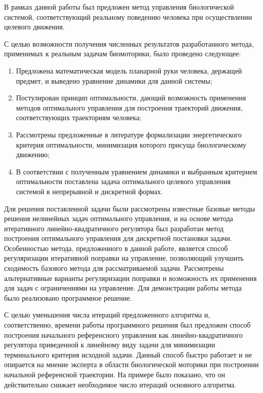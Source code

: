 \documentclass[../doc.tex]{subfiles}
\begin{document}
    В рамках данной работы был предложен метод управления биологической системой,
    соответствующий реальному поведению человека при осуществлении целевого движения.

    С целью возможности получения численных результатов разработанного метода,
        применимых к реальным задачам биомоторики, было проведено следующее:
    \begin{enumerate}\itemsep0em
        \item Предложена математическая модель планарной руки человека, держащей предмет,
            и выведено уравнение динамики для данной системы;
        \item Постулирован принцип оптимальности, дающий возможность применения методов
            оптимального управления для построения траекторий движения, соответствующих
            траекториям человека;
        \item Рассмотрены предложенные в литературе формализации энергетического критерия оптимальности, минимизация которого присуща биологическому движению;
        \item В соответствии с полученным уравнением динамики и выбранным критерием оптимальности поставлена задача оптимального целевого управления системой в непрерывной и дискретной формах.
    \end{enumerate}
    
    Для решения поставленной задачи были рассмотрены известные базовые методы решения нелинейных
        задач оптимального управления, и на основе метода итеративного линейно-квадратичного регулятора
        был разработан метод построения оптимального управления для дискретной постановки задачи.
    Особенностью метода, предложенного в данной работе, является способ регуляризации итеративной поправки на управление,
        позволяющий улучшить сходимость базового метода для рассматриваемой задачи.
    Рассмотрены альтернативные варианты регуляризации поправки и возможность их применения для задач
        с ограничениями на управление.
    Для демонстрации работы метода было реализовано программное решение.

    С целью уменьшения числа итераций предложенного алгоритма и, соответственно, времени работы
        программного решения был предложен способ построения начального референсного управления как
        линейно-квадратичного регулятора приведенной к линейному виду задачи для минимизации терминального
        критерия исходной задачи.
    Данный способ быстро работает и не опирается на мнение эксперта в области биологической моторики при построении начальной референсной траектории.
    На примере было показано, что он действительно снижает необходимое число итераций основного алгоритма.
    
\end{document}
